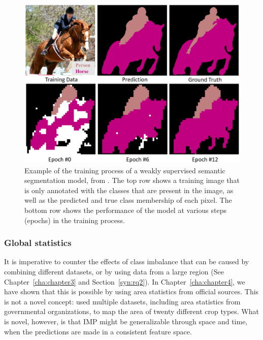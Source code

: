             \begin{figure}[H]
            \centering
            \includegraphics[width=0.75\linewidth]{figs_06/huang_person_horse.png}
            \caption{Example of the training process of a weakly supervised semantic segmentation model, from \citet{huang2018weaklysupervised}. The top row shows a training image that is only annotated with the classes that are present in the image, as well as the predicted and true class membership of each pixel. The bottom row shows the performance of the model at various steps (epochs) in the training process.}
            \label{fig:weaklysupervised}
            \end{figure}

        \subsubsection{Global statistics}

        It is imperative to counter the effects of class imbalance that can be caused by combining different datasets, or by using data from a large region (See Chapter\@~\ref{cha:chapter3} and Section\@~\ref{syn:rq2}). In Chapter\@~\ref{cha:chapter4}, we have shown that this is possible by using area statistics from official sources. This is not a novel concept: \citet{you2014generating} used multiple datasets, including area statistics from governmental organizations, to map the area of twenty different crop types. What is novel, however, is that IMP might be generalizable through space and time, when the predictions are made in a consistent feature space.

